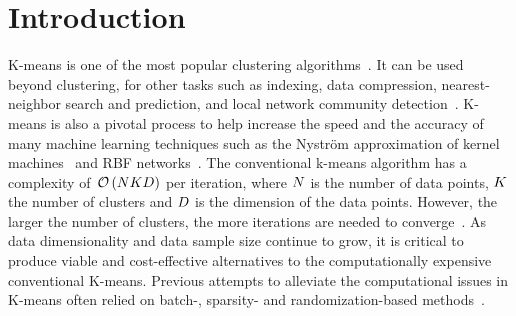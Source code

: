 \section{Introduction}

K-means is one of the most popular clustering algorithms~\cite{hartigan1979algorithm,jain2010data}. It can be used beyond clustering, for other tasks such as indexing, data compression,  nearest-neighbor search and prediction, and local network community detection~\cite{muja2014scalable,van2016local}. K-means is also a pivotal process to help increase the speed and the accuracy of many machine learning techniques such as the Nyström approximation of kernel machines~\cite{si2016computationally} and RBF networks~\cite{que2016back}.
%
The  conventional  k-means  algorithm  has  a  complexity  of~$\mathcal{O}\left (N K D\right )$ per iteration, where $N$ is the number of data points, $K$ the number of clusters and $D$ is the dimension of the data points.
However, the larger the number of clusters, the more iterations are needed to converge~\cite{arthur2006slow}.
%
As data dimensionality and data sample size continue to grow, it is critical to produce viable and cost-effective alternatives to the computationally expensive conventional K-means. 
Previous attempts to alleviate the computational issues in K-means often relied on batch-, sparsity- and randomization-based methods~\cite{Sculley2010Web, boutsidis2014randomized,shen2017compressed,liu2017sparse}.

